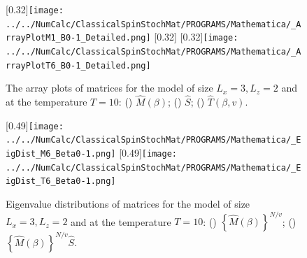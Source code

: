 \begin{figure}[htbp]
	\centering
	\subcaptionbox{\label{fig:ArrayPlotM}}[0.32\linewidth]{\texttt{[image: ../../NumCalc/ClassicalSpinStochMat/PROGRAMS/Mathematica/\_ArrayPlotM1\_B0-1\_Detailed.png]}}
	\subcaptionbox{\label{fig:ArrayPlotS}}[0.32\linewidth]{}
	\subcaptionbox{\label{fig:ArrayPlotT}}[0.32\linewidth]{\texttt{[image: ../../NumCalc/ClassicalSpinStochMat/PROGRAMS/Mathematica/\_ArrayPlotT6\_B0-1\_Detailed.png]}}
	
	\caption{The array plots of matrices for the model of size $L_{x}=3, L_{z}=2$ and at the temperature $T=10$: () $\hat{M}(\beta)$; () $\hat{S}$; () $\hat{T}(\beta,v)$.}
	\label{fig:ArrayPlot}
\end{figure}

\begin{figure}[htbp]
	\centering
	\subcaptionbox{\label{fig:EigDistM6}}[0.49\linewidth]{\texttt{[image: ../../NumCalc/ClassicalSpinStochMat/PROGRAMS/Mathematica/\_EigDist\_M6\_Beta0-1.png]}}
	\subcaptionbox{\label{fig:EigDistT6}}[0.49\linewidth]{\texttt{[image: ../../NumCalc/ClassicalSpinStochMat/PROGRAMS/Mathematica/\_EigDist\_T6\_Beta0-1.png]}}
	
	\caption{Eigenvalue distributions of matrices for the model of size $L_{x}=3, L_{z}=2$ and at the temperature $T=10$:  () $\left\{\hat{M}(\beta)\right\}^{N/v}$; () $\left\{\hat{M}(\beta)\right\}^{N/v}\hat{S}$.}
	\label{fig:EigDist}
\end{figure}

